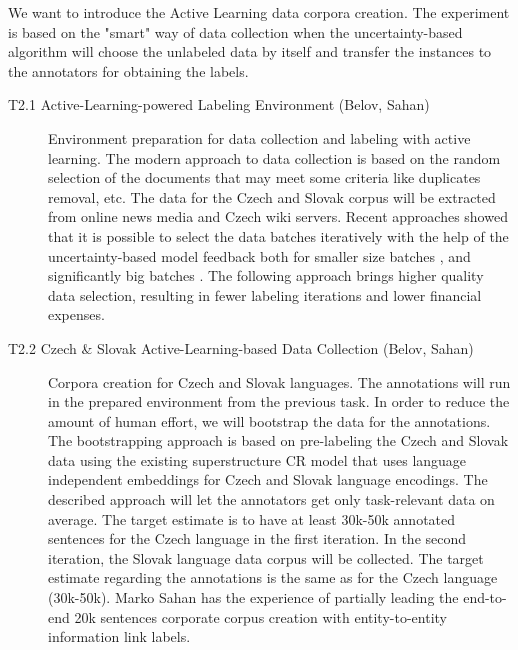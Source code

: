 We want to introduce the Active Learning data corpora creation. The experiment is based on the "smart" way of data collection when the uncertainty-based algorithm will choose the unlabeled data by itself and transfer the instances to the annotators for obtaining the labels. 

\begin{description}
	\item [T2.1 Active-Learning-powered Labeling Environment (Belov, Sahan)] Environment preparation for data collection and labeling with active learning.
	The modern approach to data collection is based on the random selection of the documents that may meet some criteria like duplicates removal, etc. The data for the Czech and Slovak corpus will be extracted from online news media and Czech wiki servers. Recent approaches showed that it is possible to select the data batches iteratively with the help of the uncertainty-based model feedback both for smaller size batches \cite{gal2017deep, lowell2018practical}, and significantly big batches \cite{citovsky2021batch}. The following approach brings higher quality data selection, resulting in fewer labeling iterations and lower financial expenses.

	\item [T2.2 Czech \& Slovak Active-Learning-based Data Collection (Belov, Sahan)] Corpora creation for Czech and Slovak languages. The annotations will run in the prepared environment from the previous task. In order to reduce the amount of human effort, we will bootstrap the data for the annotations. The bootstrapping approach is based on pre-labeling the Czech and Slovak data using the existing superstructure CR model that uses language independent embeddings for Czech and Slovak language encodings. The described approach will let the annotators get only task-relevant data on average.
	The target estimate is to have at least 30k-50k annotated sentences for the Czech language in the first iteration. In the second iteration, the Slovak language data corpus will be collected. The target estimate regarding the annotations is the same as for the Czech language (30k-50k). Marko Sahan has the experience of partially leading the end-to-end 20k sentences corporate corpus creation with entity-to-entity information link labels. 


\end{description}
